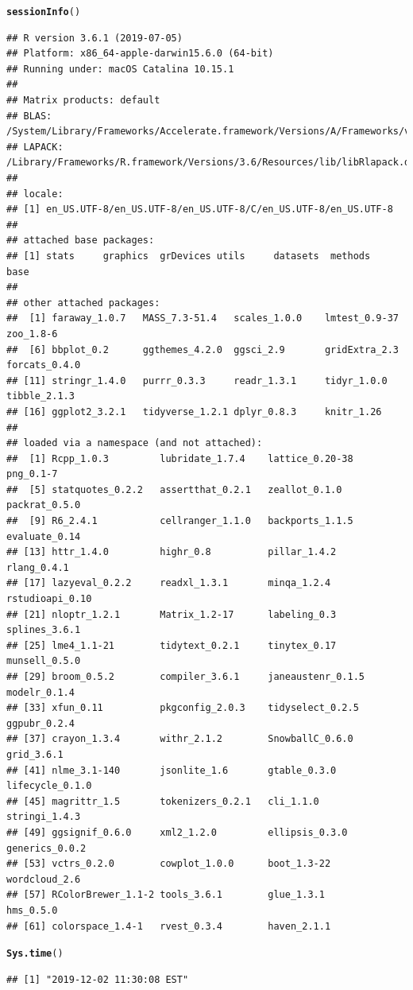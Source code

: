 \documentclass{article}\usepackage[]{graphicx}\usepackage[]{color}
\makeatletter
\newcommand{\hlstd}[1]{\textcolor[rgb]{0.345,0.345,0.345}{#1}}%
\newcommand{\hlkwd}[1]{\textcolor[rgb]{0.737,0.353,0.396}{\textbf{#1}}}%
\newenvironment{kframe}{%
 \def\at@end@of@kframe{}%
 \ifinner\ifhmode%
  \def\at@end@of@kframe{\end{minipage}}%
  \begin{minipage}{\columnwidth}%
 \fi\fi%
 \def\FrameCommand##1{\hskip\@totalleftmargin \hskip-\fboxsep
 \colorbox{shadecolor}{##1}\hskip-\fboxsep
     \hskip-\linewidth \hskip-\@totalleftmargin \hskip\columnwidth}%
 \MakeFramed {\advance\hsize-\width
   \@totalleftmargin\z@ \linewidth\hsize
   \@setminipage}}%
 {\par\unskip\endMakeFramed%
 \at@end@of@kframe}
\newenvironment{knitrout}{}{} %
\makeatother
\begin{document}
\begin{knitrout}
\color{fgcolor}\begin{kframe}
\begin{alltt}
\hlkwd{sessionInfo}\hlstd{()}
\end{alltt}
\begin{verbatim}
## R version 3.6.1 (2019-07-05)
## Platform: x86_64-apple-darwin15.6.0 (64-bit)
## Running under: macOS Catalina 10.15.1
## 
## Matrix products: default
## BLAS:   /System/Library/Frameworks/Accelerate.framework/Versions/A/Frameworks/vecLib.framework/Versions/A/libBLAS.dylib
## LAPACK: /Library/Frameworks/R.framework/Versions/3.6/Resources/lib/libRlapack.dylib
## 
## locale:
## [1] en_US.UTF-8/en_US.UTF-8/en_US.UTF-8/C/en_US.UTF-8/en_US.UTF-8
## 
## attached base packages:
## [1] stats     graphics  grDevices utils     datasets  methods   base     
## 
## other attached packages:
##  [1] faraway_1.0.7   MASS_7.3-51.4   scales_1.0.0    lmtest_0.9-37   zoo_1.8-6      
##  [6] bbplot_0.2      ggthemes_4.2.0  ggsci_2.9       gridExtra_2.3   forcats_0.4.0  
## [11] stringr_1.4.0   purrr_0.3.3     readr_1.3.1     tidyr_1.0.0     tibble_2.1.3   
## [16] ggplot2_3.2.1   tidyverse_1.2.1 dplyr_0.8.3     knitr_1.26     
## 
## loaded via a namespace (and not attached):
##  [1] Rcpp_1.0.3         lubridate_1.7.4    lattice_0.20-38    png_0.1-7         
##  [5] statquotes_0.2.2   assertthat_0.2.1   zeallot_0.1.0      packrat_0.5.0     
##  [9] R6_2.4.1           cellranger_1.1.0   backports_1.1.5    evaluate_0.14     
## [13] httr_1.4.0         highr_0.8          pillar_1.4.2       rlang_0.4.1       
## [17] lazyeval_0.2.2     readxl_1.3.1       minqa_1.2.4        rstudioapi_0.10   
## [21] nloptr_1.2.1       Matrix_1.2-17      labeling_0.3       splines_3.6.1     
## [25] lme4_1.1-21        tidytext_0.2.1     tinytex_0.17       munsell_0.5.0     
## [29] broom_0.5.2        compiler_3.6.1     janeaustenr_0.1.5  modelr_0.1.4      
## [33] xfun_0.11          pkgconfig_2.0.3    tidyselect_0.2.5   ggpubr_0.2.4      
## [37] crayon_1.3.4       withr_2.1.2        SnowballC_0.6.0    grid_3.6.1        
## [41] nlme_3.1-140       jsonlite_1.6       gtable_0.3.0       lifecycle_0.1.0   
## [45] magrittr_1.5       tokenizers_0.2.1   cli_1.1.0          stringi_1.4.3     
## [49] ggsignif_0.6.0     xml2_1.2.0         ellipsis_0.3.0     generics_0.0.2    
## [53] vctrs_0.2.0        cowplot_1.0.0      boot_1.3-22        wordcloud_2.6     
## [57] RColorBrewer_1.1-2 tools_3.6.1        glue_1.3.1         hms_0.5.0         
## [61] colorspace_1.4-1   rvest_0.3.4        haven_2.1.1
\end{verbatim}
\begin{alltt}
\hlkwd{Sys.time}\hlstd{()}
\end{alltt}
\begin{verbatim}
## [1] "2019-12-02 11:30:08 EST"
\end{verbatim}
\end{kframe}
\end{knitrout}
\end{document}
